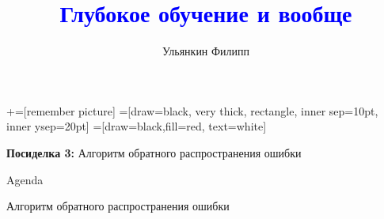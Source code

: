 \documentclass[notes,12pt, aspectratio=169]{beamer}
\title[]{\textcolor{blue}{Глубокое обучение и вообще}}
\author{Ульянкин Филипп}
\newenvironment{wideitemize}{\itemize\addtolength{\itemsep}{10pt}}{\enditemize}
\begin{document}
\newcommand\marktopleft[1]{%
    \tikz[overlay,remember picture] 
        \node (marker-#1-a) at (-.3em,.3em) {};%
}
\newcommand\markbottomright[2]{%
    \tikz[overlay,remember picture] 
        \node (marker-#1-b) at (0em,0em) {};%
}
+=[remember picture] 
 =[draw=black, very thick, rectangle, inner sep=10pt, inner ysep=20pt]
 =[draw=black,fill=red, text=white]


\begin{frame}
\maketitle
\centering \textbf{\color{blue} Посиделка 3:}  Алгоритм обратного распространения ошибки
\end{frame}

\begin{frame}{Agenda}
\begin{wideitemize}
	\item Алгоритм обратного распространения ошибки 
\end{wideitemize} 
\end{frame}
\end{document}
